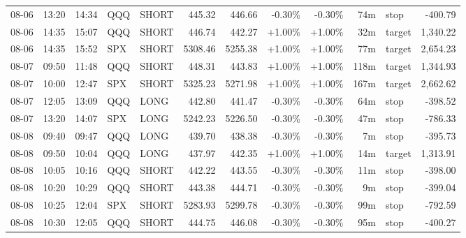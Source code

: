 \documentclass[11pt,a4paper,twoside]{article}
\begin{document}
\begin{center}
\begin{longtable}{>{\color{txtmain}}l l l l l r r r r r >{\color{txtmain}}l r}
08-06 & 13:20 & 14:34 & QQQ & SHORT & 445.32 & 446.66 & \textcolor{lossred}{-0.30\%} & \textcolor{lossred}{-0.30\%} & 74m & stop & \textcolor{lossred}{-400.79} \\
08-06 & 14:35 & 15:07 & QQQ & SHORT & 446.74 & 442.27 & \textcolor{wingreen}{+1.00\%} & \textcolor{wingreen}{+1.00\%} & 32m & target & \textcolor{wingreen}{1,340.22} \\
08-06 & 14:35 & 15:52 & SPX & SHORT & 5308.46 & 5255.38 & \textcolor{wingreen}{+1.00\%} & \textcolor{wingreen}{+1.00\%} & 77m & target & \textcolor{wingreen}{2,654.23} \\
08-07 & 09:50 & 11:48 & QQQ & SHORT & 448.31 & 443.83 & \textcolor{wingreen}{+1.00\%} & \textcolor{wingreen}{+1.00\%} & 118m & target & \textcolor{wingreen}{1,344.93} \\
08-07 & 10:00 & 12:47 & SPX & SHORT & 5325.23 & 5271.98 & \textcolor{wingreen}{+1.00\%} & \textcolor{wingreen}{+1.00\%} & 167m & target & \textcolor{wingreen}{2,662.62} \\
08-07 & 12:05 & 13:09 & QQQ & LONG & 442.80 & 441.47 & \textcolor{lossred}{-0.30\%} & \textcolor{lossred}{-0.30\%} & 64m & stop & \textcolor{lossred}{-398.52} \\
08-07 & 13:20 & 14:07 & SPX & LONG & 5242.23 & 5226.50 & \textcolor{lossred}{-0.30\%} & \textcolor{lossred}{-0.30\%} & 47m & stop & \textcolor{lossred}{-786.33} \\
08-08 & 09:40 & 09:47 & QQQ & LONG & 439.70 & 438.38 & \textcolor{lossred}{-0.30\%} & \textcolor{lossred}{-0.30\%} & 7m & stop & \textcolor{lossred}{-395.73} \\
08-08 & 09:50 & 10:04 & QQQ & LONG & 437.97 & 442.35 & \textcolor{wingreen}{+1.00\%} & \textcolor{wingreen}{+1.00\%} & 14m & target & \textcolor{wingreen}{1,313.91} \\
08-08 & 10:05 & 10:16 & QQQ & SHORT & 442.22 & 443.55 & \textcolor{lossred}{-0.30\%} & \textcolor{lossred}{-0.30\%} & 11m & stop & \textcolor{lossred}{-398.00} \\
08-08 & 10:20 & 10:29 & QQQ & SHORT & 443.38 & 444.71 & \textcolor{lossred}{-0.30\%} & \textcolor{lossred}{-0.30\%} & 9m & stop & \textcolor{lossred}{-399.04} \\
08-08 & 10:25 & 12:04 & SPX & SHORT & 5283.93 & 5299.78 & \textcolor{lossred}{-0.30\%} & \textcolor{lossred}{-0.30\%} & 99m & stop & \textcolor{lossred}{-792.59} \\
08-08 & 10:30 & 12:05 & QQQ & SHORT & 444.75 & 446.08 & \textcolor{lossred}{-0.30\%} & \textcolor{lossred}{-0.30\%} & 95m & stop & \textcolor{lossred}{-400.27} \\

\end{longtable}
\end{center}
\end{document}
